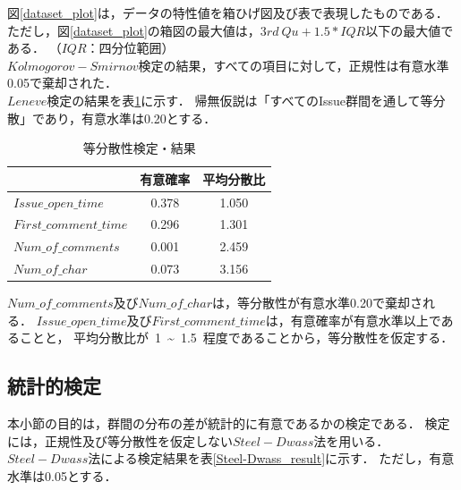 図\ref{dataset_plot}は，データの特性値を箱ひげ図及び表で表現したものである．
ただし，図\ref{dataset_plot}の箱図の最大値は，$3rd~Qu + 1.5 * IQR$以下の最大値である．
（$IQR$：四分位範囲）
\\
$Kolmogorov-Smirnov$検定の結果，すべての項目に対して，正規性は有意水準0.05で棄却された．
\\
$Leneve$検定の結果を表\ref{levene_result}に示す．
帰無仮説は「すべてのIssue群間を通して等分散」であり，有意水準は0.20とする．

\begin{table}[h]
  \begin{center}
  \caption{等分散性検定・結果}
  \begin{tabular}{l|c c} 
    \hline
     & 有意確率 & 平均分散比 \\ 
    \hline \hline
    $Issue\_open\_time$ & 0.378 & 1.050 \\
    $First\_comment\_time$ & 0.296 & 1.301 \\
    $Num\_of\_comments$ & 0.001 & 2.459 \\
    $Num\_of\_char$ & 0.073 & 3.156 \\
    \hline
  \end{tabular}
  \label{levene_result}
  \end{center}
\end{table}

$Num\_of\_comments$及び$Num\_of\_char$は，等分散性が有意水準0.20で棄却される．
$Issue\_open\_time$及び$First\_comment\_time$は，有意確率が有意水準以上であることと，
平均分散比が~1~\textasciitilde ~1.5~程度であることから，等分散性を仮定する．


\subsection{統計的検定}
本小節の目的は，群間の分布の差が統計的に有意であるかの検定である．
検定には，正規性及び等分散性を仮定しない$Steel-Dwass$法を用いる．
$Steel-Dwass$法による検定結果を表\ref{Steel-Dwass_result}に示す．
ただし，有意水準は0.05とする．

